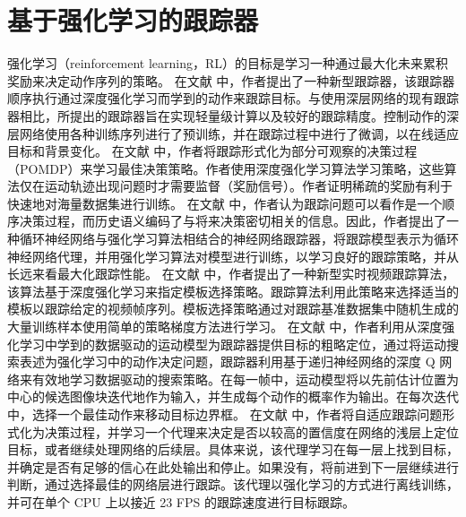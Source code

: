 \section{基于强化学习的跟踪器}
强化学习（reinforcement learning，RL）的目标是学习一种通过最大化未来累积奖励来决定动作序列的策略。
在文献 \cite{yun2017action} 中，作者提出了一种新型跟踪器，该跟踪器顺序执行通过深度强化学习而学到的动作来跟踪目标。与使用深层网络的现有跟踪器相比，所提出的跟踪器旨在实现轻量级计算以及较好的跟踪精度。控制动作的深层网络使用各种训练序列进行了预训练，并在跟踪过程中进行了微调，以在线适应目标和背景变化。 %
在文献 \cite{supancic2017tracking} 中，作者将跟踪形式化为部分可观察的决策过程（POMDP）来学习最佳决策策略。作者使用深度强化学习算法学习策略，这些算法仅在运动轨迹出现问题时才需要监督（奖励信号）。作者证明稀疏的奖励有利于快速地对海量数据集进行训练。 %
在文献 \cite{DeepReinforcement} 中，作者认为跟踪问题可以看作是一个顺序决策过程，而历史语义编码了与将来决策密切相关的信息。因此，作者提出了一种循环神经网络与强化学习算法相结合的神经网络跟踪器，将跟踪模型表示为循环神经网络代理，并用强化学习算法对模型进行训练，以学习良好的跟踪策略，并从长远来看最大化跟踪性能。%
在文献 \cite{RealTimeVisual} 中，作者提出了一种新型实时视频跟踪算法，该算法基于深度强化学习来指定模板选择策略。跟踪算法利用此策略来选择适当的模板以跟踪给定的视频帧序列。模板选择策略通过对跟踪基准数据集中随机生成的大量训练样本使用简单的策略梯度方法进行学习。%
在文献 \cite{HierarchicalTracking} 中，作者利用从深度强化学习中学到的数据驱动的运动模型为跟踪器提供目标的粗略定位，通过将运动搜索表述为强化学习中的动作决定问题，跟踪器利用基于递归神经网络的深度 Q 网络来有效地学习数据驱动的搜索策略。在每一帧中，运动模型将以先前估计位置为中心的候选图像块迭代地作为输入，并生成每个动作的概率作为输出。在每次迭代中，选择一个最佳动作来移动目标边界框。%
在文献 \cite{LearningPolicies} 中，作者将自适应跟踪问题形式化为决策过程，并学习一个代理来决定是否以较高的置信度在网络的浅层上定位目标，或者继续处理网络的后续层。具体来说，该代理学习在每一层上找到目标，并确定是否有足够的信心在此处输出和停止。如果没有，将前进到下一层继续进行判断，通过选择最佳的网络层进行跟踪。该代理以强化学习的方式进行离线训练，并可在单个 CPU 上以接近 23 FPS 的跟踪速度进行目标跟踪。%
